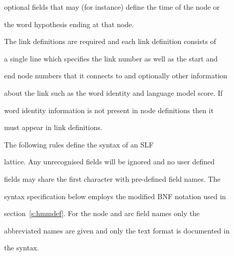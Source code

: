 optional fields that may (for instance) define the time of the node or


the word hypothesis ending at that node.





The link definitions are required and each link definition consists of


a single line which specifies the link number as well as the start and


end node numbers that it connects to and optionally other information


about the link such as the word identity and language model score. If


word identity information is not present in node definitions then it


must appear in link definitions.










The following rules define the syntax of an SLF


lattice. Any unrecognised fields will be ignored and no user defined


fields may share the first character with pre-defined field names. The


syntax specification below employs the modified BNF notation used in


section~\ref{s:hmmdef}. For the node and arc field names only the


abbreviated names are given and only the text format is documented in


the syntax.








